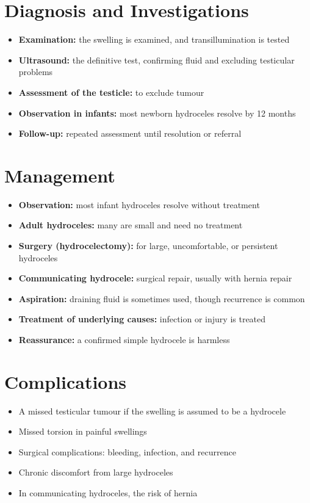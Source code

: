 \section*{Diagnosis and Investigations}
\begin{itemize}
    \item \textbf{Examination:} the swelling is examined, and transillumination is tested
    \item \textbf{Ultrasound:} the definitive test, confirming fluid and excluding testicular problems
    \item \textbf{Assessment of the testicle:} to exclude tumour
    \item \textbf{Observation in infants:} most newborn hydroceles resolve by 12 months
    \item \textbf{Follow-up:} repeated assessment until resolution or referral
\end{itemize}

\section*{Management}
\begin{itemize}
    \item \textbf{Observation:} most infant hydroceles resolve without treatment
    \item \textbf{Adult hydroceles:} many are small and need no treatment
    \item \textbf{Surgery (hydrocelectomy):} for large, uncomfortable, or persistent hydroceles
    \item \textbf{Communicating hydrocele:} surgical repair, usually with hernia repair
    \item \textbf{Aspiration:} draining fluid is sometimes used, though recurrence is common
    \item \textbf{Treatment of underlying causes:} infection or injury is treated
    \item \textbf{Reassurance:} a confirmed simple hydrocele is harmless
\end{itemize}

\section*{Complications}
\begin{itemize}
    \item A missed testicular tumour if the swelling is assumed to be a hydrocele
    \item Missed torsion in painful swellings
    \item Surgical complications: bleeding, infection, and recurrence
    \item Chronic discomfort from large hydroceles
    \item In communicating hydroceles, the risk of hernia
\end{itemize}

